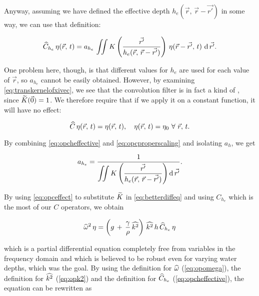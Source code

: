 Anyway, assuming we have defined the effective depth \mbox{$h_e(\vec{r},\,\vec{r}-\vec{r'})$} in some way, we can use that definition:

\begin{equation} \label{eq:opcheffective}
\widehat{C}_{h_e}\,\eta(\vec{r},\,t) = a_{h_e}\,\iint K\left(\frac{\vec{r'}}{h_e(\vec{r},\,\vec{r}-\vec{r'})}\right)\,\eta(\vec{r}-\vec{r'},\,t)\,\operatorname{d}\vec{r'}.
\end{equation}

One problem here, though, is that different values for $h_e$ are used for each value of $\vec{r}$, so $a_{h_e}$ cannot be easily obtained. However, by examining \eqref{eq:transkernelofxivec}, we see that the convolution filter is in fact a kind of , since $\widetilde{K}(\vec{0}) = 1$. We therefore require that if we apply it on a constant function, it will have no effect:

\begin{equation} \label{eq:opcproperscaling}
\widehat{C}\,\eta(\vec{r},\,t) = \eta(\vec{r},\,t),\quad\eta(\vec{r},\,t) = \eta_0\ \forall\ \vec{r},\,t.
\end{equation}

By combining \eqref{eq:opcheffective} and \eqref{eq:opcproperscaling} and isolating $a_h$, we get

\begin{equation} \label{eq:scalinghunknown}
a_{h_e} = \frac{1}{\displaystyle\iint K\left(\frac{\vec{r'}}{h_e(\vec{r},\,\vec{r}-\vec{r'})}\right) \operatorname{d}\vec{r'}}.
\end{equation}

By using \eqref{eq:opceffect} to substitute $\widetilde{K}$ in \eqref{eq:betterdiffeq} and using $C_{h_e}$ which is the most  of our $C$ operators, we obtain

\begin{equation} \label{eq:bestdiffeq}
\widehat{\omega}^2\,\eta = \left(g\,+\,\frac{\gamma}{\rho}\,\widehat{k^2}\right)\,\widehat{k^2}\,h\,\widehat{C}_{h_e}\,\eta
\end{equation}

which is a partial differential equation completely free from variables in the frequency domain and which is believed to be robust even for varying water depths, which was the goal. By using the definition for $\widehat{\omega}$ (\eqref{eq:opomega}), the definition for $\widehat{k^2}$ (\eqref{eq:opk2}) and the definition for $\widehat{C}_{h_e}$ (\eqref{eq:opcheffective}), the equation can be rewritten as

